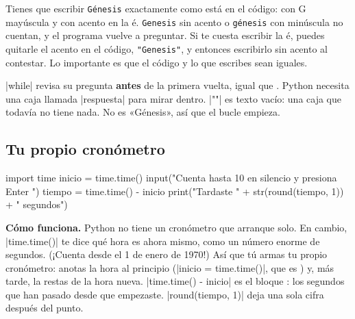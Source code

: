 \begin{watchout}
Tienes que escribir \texttt{Génesis} exactamente como está en el código: con G mayúscula y con acento en la é. \texttt{Genesis} sin acento o \texttt{génesis} con minúscula no cuentan, y el programa vuelve a preguntar. Si te cuesta escribir la é, puedes quitarle el acento en el código, \texttt{"Genesis"}, y entonces escribirlo sin acento al contestar. Lo importante es que el código y lo que escribes sean iguales.
\end{watchout}

\begin{think}[¿Por qué \texttt{respuesta = ""} en la línea 1?]
\py|while| revisa su pregunta \textbf{antes} de la primera vuelta, igual que . Python necesita una caja llamada \py|respuesta| para mirar dentro. \py|""| es texto vacío: una caja que todavía no tiene nada. No es «Génesis», así que el bucle empieza.
\end{think}

\subsection*{Tu propio cronómetro}

\begin{center}
\begin{scratch}
\end{scratch}
\end{center}
\vspace{-4pt}
\begin{code}
import time
inicio = time.time()
input("Cuenta hasta 10 en silencio y presiona Enter ")
tiempo = time.time() - inicio
print("Tardaste " + str(round(tiempo, 1)) + " segundos")
\end{code}

\textbf{Cómo funciona.} Python no tiene un cronómetro que arranque solo. En cambio, \py|time.time()| te dice qué hora es ahora mismo, como un número enorme de segundos. (¡Cuenta desde el 1 de enero de 1970!) Así que tú armas tu propio cronómetro: anotas la hora al principio (\py|inicio = time.time()|, que es ) y, más tarde, la restas de la hora nueva. \py|time.time() - inicio| es el bloque : los segundos que han pasado desde que empezaste. \py|round(tiempo, 1)| deja una sola cifra después del punto.

